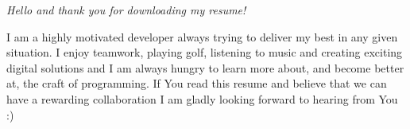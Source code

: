 {\itshape 
Hello and thank you for downloading my resume!

I am a highly motivated developer always trying to deliver my best in any given situation. 
I enjoy teamwork, playing golf, listening to music and creating exciting digital solutions 
and I am always hungry to learn more about, and become better at, the craft of programming.
If You read this resume and believe that we can have a rewarding collaboration I am gladly 
looking forward to hearing from You :)}